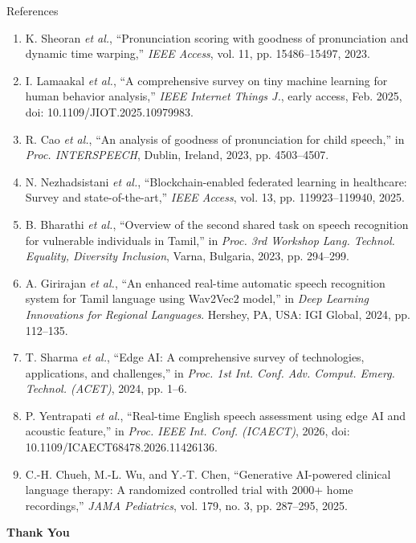 \documentclass[aspectratio=169, 11pt, xcolor=table]{beamer}
\begin{document}
\begin{frame}[allowframebreaks]{References}
    \tiny
    \begin{enumerate}
        \item K. Sheoran \textit{et al.}, ``Pronunciation scoring with goodness of pronunciation and dynamic time warping,'' \textit{IEEE Access}, vol. 11, pp. 15486--15497, 2023.
        
        \item I. Lamaakal \textit{et al.}, ``A comprehensive survey on tiny machine learning for human behavior analysis,'' \textit{IEEE Internet Things J.}, early access, Feb. 2025, doi: 10.1109/JIOT.2025.10979983.
        
        \item R. Cao \textit{et al.}, ``An analysis of goodness of pronunciation for child speech,'' in \textit{Proc. INTERSPEECH}, Dublin, Ireland, 2023, pp. 4503--4507.
        
        \item N. Nezhadsistani \textit{et al.}, ``Blockchain-enabled federated learning in healthcare: Survey and state-of-the-art,'' \textit{IEEE Access}, vol. 13, pp. 119923--119940, 2025.
        
        \item B. Bharathi \textit{et al.}, ``Overview of the second shared task on speech recognition for vulnerable individuals in Tamil,'' in \textit{Proc. 3rd Workshop Lang. Technol. Equality, Diversity Inclusion}, Varna, Bulgaria, 2023, pp. 294--299.
        
        \item A. Girirajan \textit{et al.}, ``An enhanced real-time automatic speech recognition system for Tamil language using Wav2Vec2 model,'' in \textit{Deep Learning Innovations for Regional Languages}. Hershey, PA, USA: IGI Global, 2024, pp. 112--135.
        
        \item T. Sharma \textit{et al.}, ``Edge AI: A comprehensive survey of technologies, applications, and challenges,'' in \textit{Proc. 1st Int. Conf. Adv. Comput. Emerg. Technol. (ACET)}, 2024, pp. 1--6.

        \item P. Yentrapati \textit{et al.}, ``Real-time English speech assessment using edge AI and acoustic feature,'' in \textit{Proc. IEEE Int. Conf. (ICAECT)}, 2026, doi: 10.1109/ICAECT68478.2026.11426136.

        \item C.-H. Chueh, M.-L. Wu, and Y.-T. Chen, ``Generative AI-powered clinical language therapy: A randomized controlled trial with 2000+ home recordings,'' \textit{JAMA Pediatrics}, vol. 179, no. 3, pp. 287--295, 2025.
    \end{enumerate}
\end{frame}
\begin{frame}
    \centering
    {\Huge \textbf{\textcolor{amritaMaroon}{Thank You}}}
\end{frame}
\end{document}
